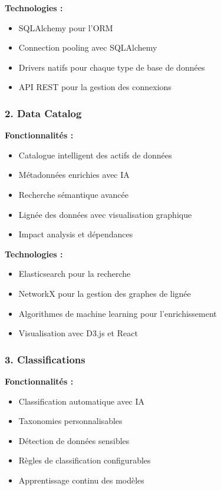 \documentclass[12pt,a4paper]{article}
\begin{document}
\textbf{Technologies :}
\begin{itemize}
    \item SQLAlchemy pour l'ORM
    \item Connection pooling avec SQLAlchemy
    \item Drivers natifs pour chaque type de base de données
    \item API REST pour la gestion des connexions
\end{itemize}

\subsubsection{2. Data Catalog}
\textbf{Fonctionnalités :}
\begin{itemize}
    \item Catalogue intelligent des actifs de données
    \item Métadonnées enrichies avec IA
    \item Recherche sémantique avancée
    \item Lignée des données avec visualisation graphique
    \item Impact analysis et dépendances
\end{itemize}

\textbf{Technologies :}
\begin{itemize}
    \item Elasticsearch pour la recherche
    \item NetworkX pour la gestion des graphes de lignée
    \item Algorithmes de machine learning pour l'enrichissement
    \item Visualisation avec D3.js et React
\end{itemize}

\subsubsection{3. Classifications}
\textbf{Fonctionnalités :}
\begin{itemize}
    \item Classification automatique avec IA
    \item Taxonomies personnalisables
    \item Détection de données sensibles
    \item Règles de classification configurables
    \item Apprentissage continu des modèles
\end{itemize}
\end{document}

